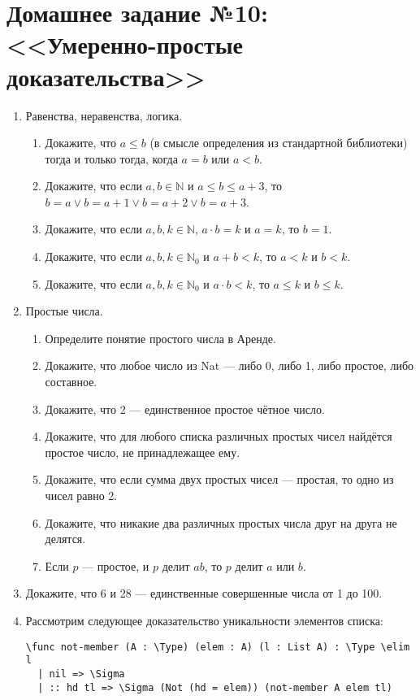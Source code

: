 \documentclass[10pt,a4paper,oneside]{article}
\begin{document}
\section*{Домашнее задание №10: <<Умеренно-простые доказательства>>}
\begin{enumerate}
\item Равенства, неравенства, логика.
\begin{enumerate}
\item Докажите, что $a \le b$ (в смысле определения из стандартной библиотеки)
тогда и только тогда, когда $a = b$ или $a < b$.
\item Докажите, что если $a,b \in \mathbb{N}$ и $a \le b \le a + 3$, то 
$b = a \vee b = a+1 \vee b = a+2 \vee b = a+3$.
\item Докажите, что если $a,b,k \in \mathbb{N}$, $a \cdot b = k$ и $a = k$, то $b = 1$.
\item Докажите, что если $a,b,k \in \mathbb{N}_0$ и $a + b < k$, то $a < k$ и $b < k$.
\item Докажите, что если $a,b,k \in \mathbb{N}_0$ и $a \cdot b < k$, то $a \le k$ и $b \le k$.
\end{enumerate}

\item Простые числа.
\begin{enumerate}
\item Определите понятие простого числа в Аренде.
\item Докажите, что любое число из Nat --- либо 0, либо 1, либо простое, либо составное.
\item Докажите, что 2 --- единственное простое чётное число.
\item Докажите, что для любого списка различных простых чисел найдётся простое число, не принадлежащее ему.
\item Докажите, что если сумма двух простых чисел --- простая, то одно из чисел равно 2.
\item Докажите, что никакие два различных простых числа друг на друга не делятся.
\item Если $p$ — простое, и $p$ делит $ab$, то $p$ делит $a$ или $b$.
\end{enumerate}

\item Докажите, что 6 и 28 --- единственные совершенные числа от 1 до 100.

\item Рассмотрим следующее доказательство уникальности элементов списка:
\begin{verbatim}
\func not-member (A : \Type) (elem : A) (l : List A) : \Type \elim l
  | nil => \Sigma
  | :: hd tl => \Sigma (Not (hd = elem)) (not-member A elem tl)


\end{verbatim}
\end{enumerate}
\end{document}

